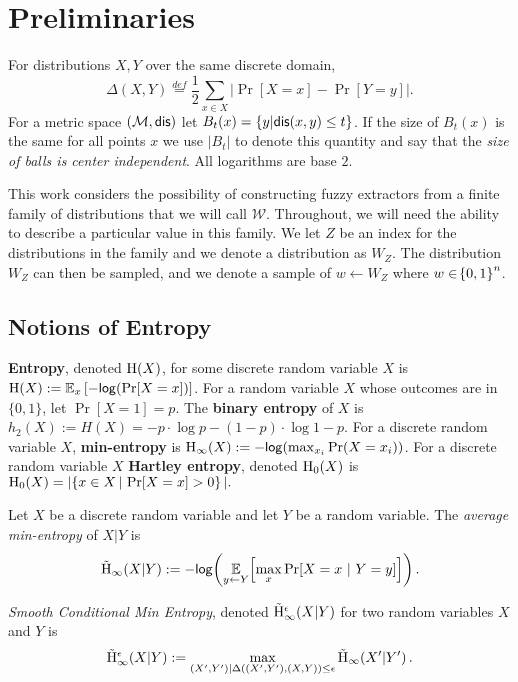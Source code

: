 
\section{Preliminaries}
\label{sec:prelim}
For distributions $X, Y$ over the same discrete domain,
\[
\Delta(X, Y)\overset{def}= \frac{1}{2}\sum_{x \in X} \left| \Pr[X=x] - \Pr[Y=y]\right|.
\]
For a metric space $(\mathcal{M}, \mathsf{dis})$ let $B_t(x) = \{y | \mathsf{dis}(x, y)\le t\}$. If the size of $B_t(x)$ is the same for all points $x$ we use $|B_t|$ to denote this quantity and say that the \emph{size of balls is center independent}.  All logarithms are base $2$.

This work considers the possibility of constructing fuzzy extractors from a finite family of distributions that we will call $\mathcal{W}$. 
Throughout, we will need the ability to describe a particular value in this family.  
We let $Z$ be an index for the distributions in the family and we denote a distribution as $W_Z$. 
The distribution $W_Z$ can then be sampled, and we denote a sample of $w\leftarrow W_Z$ where  $w \in \!\left\{ 0,1 \right\}^{n}$.

\subsection{Notions of Entropy}
    \textbf{Entropy}, denoted $\mathrm{H}\!\left(X\right)$, for some discrete random variable $X$ is $\mathrm{H}\!\left(X\right) := \operatorname*{\mathbb{E}}_x\left[-\mathsf{log}\!\left(\Pr[X=x]\right)\right]$. 
    For a random variable $X$ whose outcomes are in $\{0,1\}$, let $\Pr[X=1] = p$. The \textbf{binary entropy} of $X$ is  $h_2(X) :=H(X)=-p\cdot\log{p} - (1-p)\cdot\log{1-p}.$ 
For a discrete random variable $X$, 
    \textbf{min-entropy} is $\mathrm{H}_{\infty}\!\left(X\right) := -\mathsf{log}\!\left(\max_{x_i} \Pr(X=x_i)\right)$.  
For a discrete random variable $X$ \textbf{Hartley entropy}, denoted $\mathrm{H}_0\!\left(X\right)$ is 
$  \mathrm{H}_0\!\left(X\right) = | \!\left\{ x \in X\,|\, \Pr\!\left[X = x\right] > 0 \right\}|.
  $
\begin{definition}
Let $X$ be a discrete random variable and let $Y$ be a random variable.  The \emph{average min-entropy} of $X|Y$ is  \[ \tilde{\mathrm{H}}_{\infty}\!\left(X|Y\right) := -\mathsf{log}\!\left(\operatorname*{\mathbb{E}}\limits_{y \leftarrow Y}\!\left[\max\limits_{x} \Pr\!\left[X = x\ |\ Y = y\right]\right]\right).\] 
\end{definition}

\begin{definition}
    \emph{Smooth Conditional Min Entropy}, denoted $\tilde{\mathrm{H}}_\infty^\epsilon(X|Y)$ for two random variables $X$ and $Y$ is \[\tilde{\mathrm{H}}_\infty^\epsilon(X|Y):=\max_{(X',Y') | \Delta((X', Y'), (X, Y))\le \epsilon} \tilde{\mathrm{H}}_{\infty}\!\left(X'|Y'\right).
    \] 
\end{definition}

